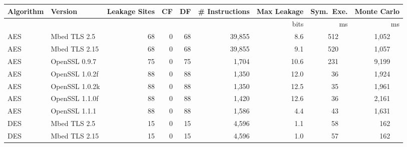 \begin{table}[h]
    \begin{tabular}{llrrrrrrr}
        \hline
        \textbf{Algorithm} & \textbf{Version}  & \textbf{Leakage Sites} & \textbf{CF}         & \textbf{DF}
                           & \textbf{\# Instructions} & \textbf{Max Leakage}   & \textbf{Sym.\ Exe.} & \textbf{Monte Carlo}                                                    \\\hline
                           &                          &                        &                     &                      &             & bits & ms        & ms              \\\cline{7-9}
        AES                & Mbed TLS 2.5             & 68                     & 0                   & 68                   & 39,855      & 8.6  & 512 ~~    & 1,052 ~~        \\
        AES                & Mbed TLS 2.15            & 68                     & 0                   & 68                   & 39,855      & 9.1  & 520 ~~    & 1,057 ~~        \\
        AES                & OpenSSL 0.9.7            & 75                     & 0                   & 75                   & 1,704       & 10.6 & 231 ~~    & 9,199 ~~        \\
        AES                & OpenSSL 1.0.2f           & 88                     & 0                   & 88                   & 1,350       & 12.0 & 36 ~~     & 1,924 ~~        \\
        AES                & OpenSSL 1.0.2k           & 88                     & 0                   & 88                   & 1,350       & 12.5 & 35 ~~     & 1,961 ~~        \\
        AES                & OpenSSL 1.1.0f           & 88                     & 0                   & 88                   & 1,420       & 12.6 & 36 ~~     & 2,161 ~~        \\
        AES                & OpenSSL 1.1.1            & 88                     & 0                   & 88                   & 1,586       & 4.4  & 43 ~~     & 1,631 ~~        \\
        DES                & Mbed TLS 2.5             & 15                     & 0                   & 15                   & 4,596       & 1.1  & 58 ~~     & 162 ~~          \\
        DES                & Mbed TLS 2.15            & 15                     & 0                   & 15                   & 4,596       & 1.0  & 57 ~~     & 162 ~~          \\

\end{tabular}
\end{table}
